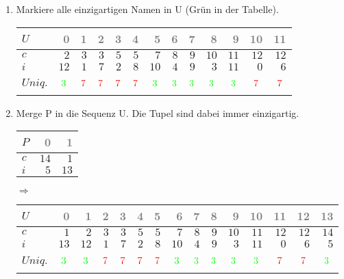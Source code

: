 \begin{enumerate}
\item 
Markiere alle einzigartigen Namen in U (Grün in der Tabelle).
\begin{center}
\small\begin{tabular}{lrrrrrrrrrrrr}
    \toprule 
    $U$ & \textcolor{gray}{0} & \textcolor{gray}{1} & \textcolor{gray}{2} & \textcolor{gray}{3} & \textcolor{gray}{4} & \textcolor{gray}{5} & \textcolor{gray}{6} & \textcolor{gray}{7} & \textcolor{gray}{8} & \textcolor{gray}{9} & \textcolor{gray}{10} & \textcolor{gray}{11}\\
    \midrule 
    $c$ & $2$ & $3$ & $3$ & $5$ & $5$ & $7$ & $8$ & $9$ & $10$ & $11$ & $12$ & $12$ \\
    $i$ & $12$ & $1$ & $7$ & $2$ & $8$ & $10$ & $4$ & $9$ & $3$ & $11$ & $0$ & $6$ \\
    $Uniq.$ & $$\cmarkc$$ & $$\xmarkc$$ & $$\xmarkc$$ & $$\xmarkc$$ & $$\xmarkc$$ & $$\cmarkc$$ & $$\cmarkc$$ & $$\cmarkc$$ & $$\cmarkc$$ & $$\cmarkc$$ & $$\xmarkc$$ & $$\xmarkc$$ \\
    \bottomrule 
\end{tabular}
\end{center}

\item 
Merge P in die Sequenz U. Die Tupel sind dabei immer einzigartig.
\begin{center}
\small\begin{tabular}{lrr}
    \toprule 
    $P$ & \textcolor{gray}{0} & \textcolor{gray}{1}\\
    \midrule 
    $c$ & $14$ & $1$ \\
    $i$ & $5$ & $13$ \\
    \bottomrule 
\end{tabular}
\end{center}
\begin{center}
$\Rightarrow$
\end{center}
\begin{center}
\small\begin{tabular}{lrrrrrrrrrrrrrr}
    \toprule 
    $U$ & \textcolor{gray}{0} & \textcolor{gray}{1} & \textcolor{gray}{2} & \textcolor{gray}{3} & \textcolor{gray}{4} & \textcolor{gray}{5} & \textcolor{gray}{6} & \textcolor{gray}{7} & \textcolor{gray}{8} & \textcolor{gray}{9} & \textcolor{gray}{10} & \textcolor{gray}{11} & \textcolor{gray}{12} & \textcolor{gray}{13}\\
    \midrule 
    $c$ & $1$ & $2$ & $3$ & $3$ & $5$ & $5$ & $7$ & $8$ & $9$ & $10$ & $11$ & $12$ & $12$ & $14$ \\
    $i$ & $13$ & $12$ & $1$ & $7$ & $2$ & $8$ & $10$ & $4$ & $9$ & $3$ & $11$ & $0$ & $6$ & $5$ \\
    $Uniq.$ & $$\cmarkc$$ & $$\cmarkc$$ & $$\xmarkc$$ & $$\xmarkc$$ & $$\xmarkc$$ & $$\xmarkc$$ & $$\cmarkc$$ & $$\cmarkc$$ & $$\cmarkc$$ & $$\cmarkc$$ & $$\cmarkc$$ & $$\xmarkc$$ & $$\xmarkc$$ & $$\cmarkc$$ \\
    \bottomrule 
\end{tabular}
\end{center}


\end{enumerate}
